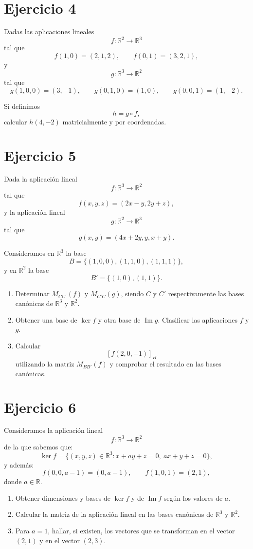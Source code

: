 \documentclass[12pt]{article}
\begin{document}
\section*{Ejercicio 4}

Dadas las aplicaciones lineales
\[
f:\mathbb{R}^2\longrightarrow \mathbb{R}^3
\]
tal que
\[
f(1,0)=(2,1,2),
\qquad
f(0,1)=(3,2,1),
\]
y
\[
g:\mathbb{R}^3\longrightarrow \mathbb{R}^2
\]
tal que
\[
g(1,0,0)=(3,-1),
\qquad
g(0,1,0)=(1,0),
\qquad
g(0,0,1)=(1,-2).
\]

Si definimos
\[
h=g\circ f,
\]
calcular \(h(4,-2)\) matricialmente y por coordenadas.

\section*{Ejercicio 5}

Dada la aplicación lineal
\[
f:\mathbb{R}^3\longrightarrow \mathbb{R}^2
\]
tal que
\[
f(x,y,z)=(2x-y,2y+z),
\]
y la aplicación lineal
\[
g:\mathbb{R}^2\longrightarrow \mathbb{R}^3
\]
tal que
\[
g(x,y)=(4x+2y,y,x+y).
\]

Consideramos en \(\mathbb{R}^3\) la base
\[
B=\{(1,0,0),(1,1,0),(1,1,1)\},
\]
y en \(\mathbb{R}^2\) la base
\[
B'=\{(1,0),(1,1)\}.
\]

\begin{enumerate}
    \item[a)] Determinar \(M_{CC'}(f)\) y \(M_{C'C}(g)\), siendo \(C\) y \(C'\) respectivamente las bases canónicas de \(\mathbb{R}^3\) y \(\mathbb{R}^2\).

    \item[b)] Obtener una base de \(\ker f\) y otra base de \(\operatorname{Im} g\). Clasificar las aplicaciones \(f\) y \(g\).

    \item[c)] Calcular
    \[
    [f(2,0,-1)]_{B'}
    \]
    utilizando la matriz \(M_{BB'}(f)\) y comprobar el resultado en las bases canónicas.
\end{enumerate}

\section*{Ejercicio 6}

Consideramos la aplicación lineal
\[
f:\mathbb{R}^3\longrightarrow \mathbb{R}^2
\]
de la que sabemos que:
\[
\ker f=\{(x,y,z)\in\mathbb{R}^3:x+ay+z=0,\ ax+y+z=0\},
\]
y además:
\[
f(0,0,a-1)=(0,a-1),
\qquad
f(1,0,1)=(2,1),
\]
donde \(a\in\mathbb{R}\).

\begin{enumerate}
    \item[a)] Obtener dimensiones y bases de \(\ker f\) y de \(\operatorname{Im} f\) según los valores de \(a\).

    \item[b)] Calcular la matriz de la aplicación lineal en las bases canónicas de \(\mathbb{R}^3\) y \(\mathbb{R}^2\).

    \item[c)] Para \(a=1\), hallar, si existen, los vectores que se transforman en el vector \((2,1)\) y en el vector \((2,3)\).
\end{enumerate}
\end{document}

